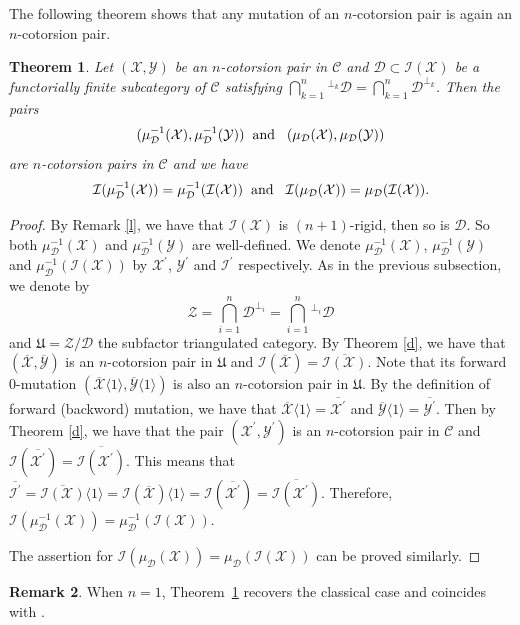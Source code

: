 \documentclass[a4paper,reqno,11pt]{amsart}
\newtheorem{theorem}{Theorem}[section]
\theoremstyle{definition}
\newtheorem{remark}[theorem]{Remark}
\def\C{\mathcal{C}}
\def\D{\mathcal{D}}
\def\X{\mathcal{X}}
\def\D{\mathcal{D}}
\def\Y{\mathcal{Y}}
\def\Z{\mathcal {Z}}
\def\I{\mathcal {I}}
\begin{document}
The following theorem shows that any mutation of an $n$-cotorsion pair
is again an $n$-cotorsion pair.

\begin{theorem}\label{main}
Let $(\X,\Y)$ be an $n$-cotorsion pair in $\C$ and $\D\subset\I(\X)$ be a functorially finite subcategory of $\C$ satisfying  $\bigcap\limits_{k=1}^{n}{^{\perp_k}}\D=\bigcap\limits_{k=1}^{n}\D^{\perp_k}$. Then the pairs $$(\mu^{-1}_{\D}(\X),\mu^{-1}_{\D}(\Y))\hspace{2mm}\mbox{and}\hspace{3mm}(\mu_{\D}(\X),\mu_{\D}(\Y))$$ are  $n$-cotorsion pairs in $\C$ and we have
$$\I(\mu^{-1}_{\D}(\X))=\mu^{-1}_{\D}(\I(\X))\hspace{2mm}\mbox{and}\hspace{3mm}\I(\mu_{\D}(\X))=\mu_{\D}(\I(\X)).$$
\end{theorem}
\begin{proof}
By Remark \ref{l}, we have that $\I(\X)$ is $(n+1)$-rigid, then so is $\D$. So both $\mu^{-1}_{\D}(\X)$ and $\mu^{-1}_{\D}(\Y)$ are well-defined. We denote $\mu^{-1}_{\D}(\X)$, $\mu^{-1}_{\D}(\Y)$ and $\mu^{-1}_{\D}(\I(\X))$ by
$\X^\prime$,  $\Y^\prime$ and $\I^\prime$ respectively. As in the previous subsection, we denote by
$$\Z=\bigcap\limits_{i=1}^{n}\D^{\perp_i}=\bigcap\limits_{i=1}^{n}{^{\perp_i}}\D$$ and $\mathfrak{U}=\Z/\D$ the subfactor triangulated category. By Theorem \ref{d}, we have that $(\overline{\X},\overline{\Y})$ is an $n$-cotorsion pair in $\mathfrak{U}$ and $\I(\overline{\X})=\overline{\I(\X)}$. Note that its  forward 0-mutation $(\overline{\X}\langle1\rangle,\overline{\Y}\langle1\rangle)$ is also an $n$-cotorsion pair in $\mathfrak{U}$. By the definition of forward (backword) mutation, we have that $\overline{\X}\langle1\rangle=\overline{\X^\prime}$ and $\overline{\Y}\langle1\rangle=\overline{\Y^\prime}$. Then by Theorem \ref{d}, we have that the pair $(\X^\prime,\Y^\prime)$ is an $n$-cotorsion pair in $\C$ and $\I(\overline{\X^\prime})=\overline{\I(\X^\prime)}$. This means that $ \overline{\I^\prime}=\overline{\I(\X)}\langle1\rangle=\I(\overline{\X})\langle1\rangle=
\I(\overline{\X^\prime})=\overline{\I(\X^\prime)}$. Therefore, $\I(\mu^{-1}_{\D}(\X))=\mu^{-1}_{\D}(\I(\X))$.

The assertion for $\I(\mu_{\D}(\X))=\mu_{\D}(\I(\X))$ can be proved similarly.
\end{proof}


\begin{remark}
When $n=1$, Theorem~\ref{main} recovers the classical case and
 coincides with \cite[Theorem 4.3]{ZZ}.
\end{remark}
\end{document}
